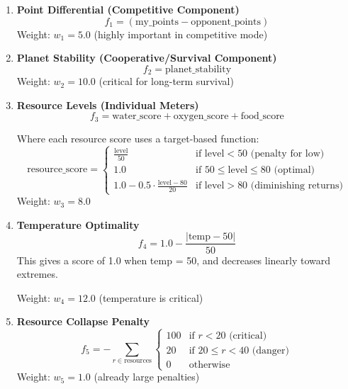\documentclass[12pt,a4paper]{article}
\begin{document}
\begin{enumerate}
    \item \textbf{Point Differential (Competitive Component)}
    \begin{equation}
    f_1 = (\text{my\_points} - \text{opponent\_points})
    \end{equation}
    Weight: $w_1 = 5.0$ (highly important in competitive mode)
    
    \item \textbf{Planet Stability (Cooperative/Survival Component)}
    \begin{equation}
    f_2 = \text{planet\_stability}
    \end{equation}
    Weight: $w_2 = 10.0$ (critical for long-term survival)
    
    \item \textbf{Resource Levels (Individual Meters)}
    \begin{equation}
    f_3 = \text{water\_score} + \text{oxygen\_score} + \text{food\_score}
    \end{equation}
    
    Where each resource score uses a target-based function:
    \begin{equation}
    \text{resource\_score} = 
    \begin{cases}
    \frac{\text{level}}{50} & \text{if level} < 50 \text{ (penalty for low)} \\
    1.0 & \text{if } 50 \leq \text{level} \leq 80 \text{ (optimal)} \\
    1.0 - 0.5 \cdot \frac{\text{level} - 80}{20} & \text{if level} > 80 \text{ (diminishing returns)}
    \end{cases}
    \end{equation}
    Weight: $w_3 = 8.0$
    
    \item \textbf{Temperature Optimality}
    \begin{equation}
    f_4 = 1.0 - \frac{|\text{temp} - 50|}{50}
    \end{equation}
    This gives a score of 1.0 when temp = 50, and decreases linearly toward extremes.
    
    Weight: $w_4 = 12.0$ (temperature is critical)
    
    \item \textbf{Resource Collapse Penalty}
    \begin{equation}
    f_5 = -\sum_{r \in \text{resources}} 
    \begin{cases}
    100 & \text{if } r < 20 \text{ (critical)} \\
    20 & \text{if } 20 \leq r < 40 \text{ (danger)} \\
    0 & \text{otherwise}
    \end{cases}
    \end{equation}
    Weight: $w_5 = 1.0$ (already large penalties)
    

\end{enumerate}
\end{document}

